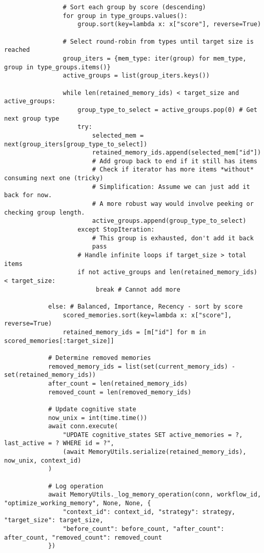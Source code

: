 \documentclass[12pt,a4paper]{article}
\begin{document}
\begin{pageablecode}
\begin{verbatim}
                # Sort each group by score (descending)
                for group in type_groups.values():
                    group.sort(key=lambda x: x["score"], reverse=True)

                # Select round-robin from types until target size is reached
                group_iters = {mem_type: iter(group) for mem_type, group in type_groups.items()}
                active_groups = list(group_iters.keys())

                while len(retained_memory_ids) < target_size and active_groups:
                    group_type_to_select = active_groups.pop(0) # Get next group type
                    try:
                        selected_mem = next(group_iters[group_type_to_select])
                        retained_memory_ids.append(selected_mem["id"])
                        # Add group back to end if it still has items
                        # Check if iterator has more items *without* consuming next one (tricky)
                        # Simplification: Assume we can just add it back for now.
                        # A more robust way would involve peeking or checking group length.
                        active_groups.append(group_type_to_select)
                    except StopIteration:
                        # This group is exhausted, don't add it back
                        pass
                    # Handle infinite loops if target_size > total items
                    if not active_groups and len(retained_memory_ids) < target_size:
                         break # Cannot add more

            else: # Balanced, Importance, Recency - sort by score
                scored_memories.sort(key=lambda x: x["score"], reverse=True)
                retained_memory_ids = [m["id"] for m in scored_memories[:target_size]]

            # Determine removed memories
            removed_memory_ids = list(set(current_memory_ids) - set(retained_memory_ids))
            after_count = len(retained_memory_ids)
            removed_count = len(removed_memory_ids)

            # Update cognitive state
            now_unix = int(time.time())
            await conn.execute(
                "UPDATE cognitive_states SET active_memories = ?, last_active = ? WHERE id = ?",
                (await MemoryUtils.serialize(retained_memory_ids), now_unix, context_id)
            )

            # Log operation
            await MemoryUtils._log_memory_operation(conn, workflow_id, "optimize_working_memory", None, None, {
                "context_id": context_id, "strategy": strategy, "target_size": target_size,
                "before_count": before_count, "after_count": after_count, "removed_count": removed_count
            })


\end{verbatim}
\end{pageablecode}
\end{document}
